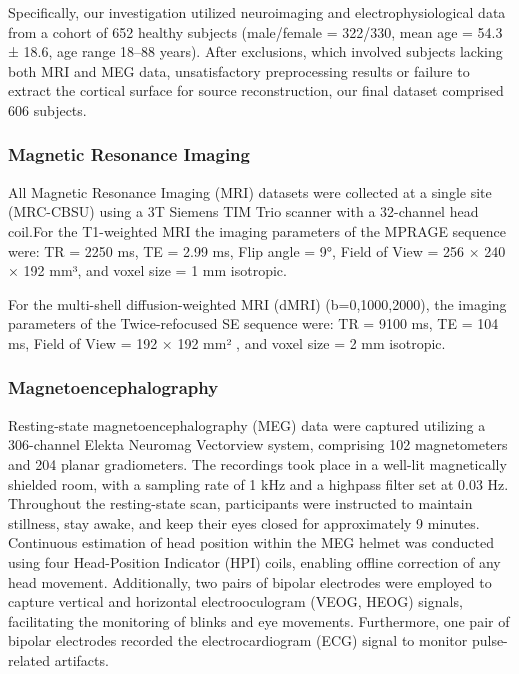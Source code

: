 \documentclass{cys}
\begin{document}
\bigskip 
Specifically, our investigation utilized neuroimaging and electrophysiological data from a cohort of 652 healthy subjects (male/female = 322/330, mean age = 54.3 ± 18.6, age range 18–88 years). After exclusions, which involved subjects lacking both MRI and MEG data, unsatisfactory preprocessing results or failure to extract the cortical surface for source reconstruction, our final dataset comprised 606 subjects.

\subsubsection{Magnetic Resonance Imaging}
All Magnetic Resonance Imaging (MRI) datasets were collected at a single site (MRC-CBSU) using a 3T Siemens TIM Trio scanner with a 32-channel head coil.For the T1-weighted MRI the imaging parameters of the MPRAGE sequence were: TR = 2250 ms, TE = 2.99 ms, Flip angle = 9°, Field of View = 256 × 240 × 192 mm³, and voxel size = 1 mm isotropic.

\bigskip
For the multi-shell diffusion-weighted MRI (dMRI) (b=0,1000,2000), the imaging parameters of the Twice-refocused SE sequence were: TR = 9100 ms, TE = 104 ms, Field of View = 192 × 192 mm² , and voxel size = 2 mm isotropic. 

\subsubsection{Magnetoencephalography}

Resting-state magnetoencephalography (MEG) data were captured utilizing a 306-channel Elekta Neuromag Vectorview system, comprising 102 magnetometers and 204 planar gradiometers. The recordings took place in a well-lit magnetically shielded room, with a sampling rate of 1 kHz and a highpass filter set at 0.03 Hz. Throughout the resting-state scan, participants were instructed to maintain stillness, stay awake, and keep their eyes closed for approximately 9 minutes. Continuous estimation of head position within the MEG helmet was conducted using four Head-Position Indicator (HPI) coils, enabling offline correction of any head movement. Additionally, two pairs of bipolar electrodes were employed to capture vertical and horizontal electrooculogram (VEOG, HEOG) signals, facilitating the monitoring of blinks and eye movements. Furthermore, one pair of bipolar electrodes recorded the electrocardiogram (ECG) signal to monitor pulse-related artifacts.

\bigskip
\end{document}
